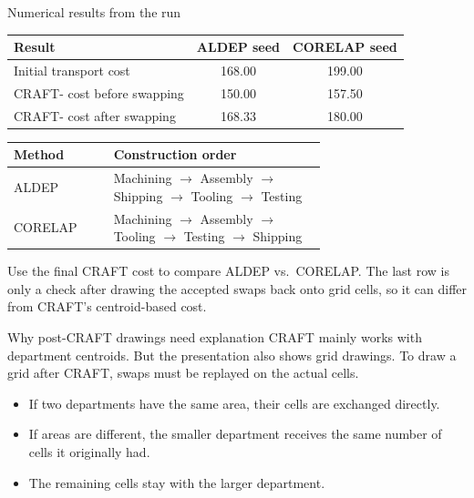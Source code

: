 \documentclass[aspectratio=169,10pt]{beamer}
\begin{document}
\begin{frame}[t]{Numerical results from the run}
  \centering
  \footnotesize
  \begin{tabular}{@{}lcc@{}}
    \toprule
    Result & ALDEP seed & CORELAP seed \\
    \midrule
    Initial transport cost & 168.00 & 199.00 \\
    CRAFT- cost before swapping & 150.00 & 157.50 \\
    CRAFT- cost after swapping & 168.33 & 180.00 \\
    \bottomrule
  \end{tabular}

  \vspace{0.8em}
  \begin{tabular}{@{}lp{0.68\linewidth}@{}}
    \toprule
    Method & Construction order \\
    \midrule
    ALDEP &
    Machining $\rightarrow$ Assembly $\rightarrow$ Shipping $\rightarrow$ Tooling $\rightarrow$ Testing \\
    CORELAP &
    Machining $\rightarrow$ Assembly $\rightarrow$ Tooling $\rightarrow$ Testing $\rightarrow$ Shipping \\
    \bottomrule
  \end{tabular}

  \vspace{0.6em}
  \RaggedRight
  \scriptsize
  Use the final CRAFT cost to compare ALDEP vs.\ CORELAP. The last row is only a check
  after drawing the accepted swaps back onto grid cells, so it can differ from CRAFT's
  centroid-based cost.
\end{frame}

\begin{frame}[t]{Why post-CRAFT drawings need explanation}
  \RaggedRight
  \small
  CRAFT mainly works with department centroids. But the presentation also shows grid drawings.
  To draw a grid after CRAFT, swaps must be replayed on the actual cells.

  \vspace{0.55em}
  \begin{itemize}
    \setlength{\itemsep}{0.35em}
    \item If two departments have the same area, their cells are exchanged directly.
    \item If areas are different, the smaller department receives the same number of cells it originally had.
    \item The remaining cells stay with the larger department.
  \end{itemize}
\end{frame}
\end{document}
